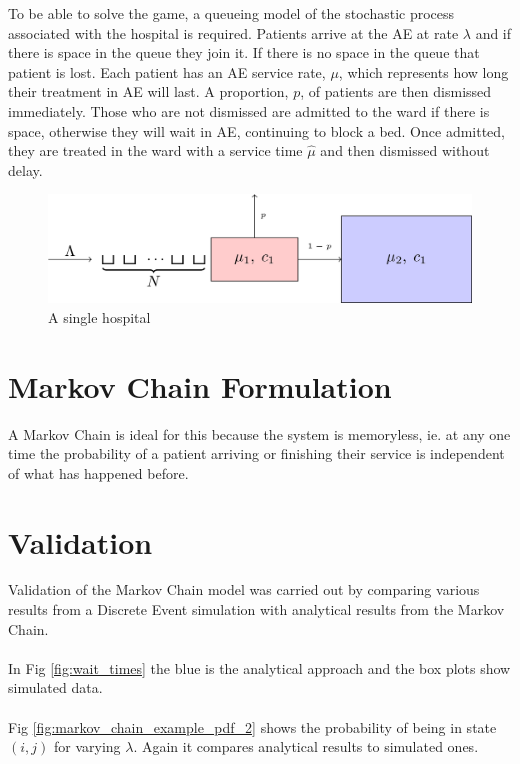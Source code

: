 \documentclass[a0,landscape]{a0poster}
\begin{document}
\begin{multicols}{3}
To be able to solve the game, a queueing model of the stochastic process associated with the hospital is required.
Patients arrive at the AE at rate $\lambda$ and if there is space in the queue they join it.
If there is no space in the queue that patient is lost.
Each patient has an AE service rate, $\mu$, which represents how long their treatment in AE will last.
A proportion, $p$, of patients are then dismissed immediately.
Those who are not dismissed are admitted to the ward if there is space, otherwise they will wait in AE, continuing to block a bed.
Once admitted, they are treated in the ward with a service time $\hat{\mu}$ and then dismissed without delay.

\begin{figure}[H]
\centering
\includegraphics[width=0.9\linewidth]{Images/tandem_queue.png}
\caption{A single hospital}
\label{fig:tandem_queue}
\end{figure}

\section*{Markov Chain Formulation}
A Markov Chain is ideal for this because the system is memoryless, ie. at any one time the probability of a patient arriving or finishing their service is independent of what has happened before.


\color{Olive}
\section*{Validation}
Validation of the Markov Chain model was carried out by comparing various results from a Discrete Event simulation with analytical results from the Markov Chain.\\
\\
In Fig \ref{fig:wait_times} the blue is the analytical approach and the box plots show simulated data.\\
\\
Fig \ref{fig:markov_chain_example_pdf_2} shows the probability of being in state $(i,j)$ for varying $\lambda$.
Again it compares analytical results to simulated ones.


\end{multicols}
\end{document}
